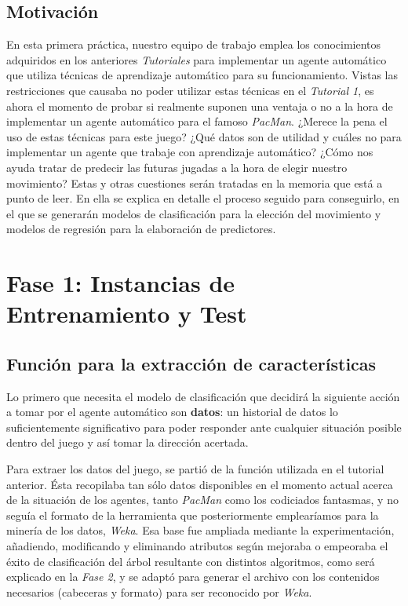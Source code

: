 \documentclass[12pt]{article}
\begin{document}
\newpage
\thispagestyle{empty}
\clearpage
\vspace*{\fill}
\begin{center}
    \begin{minipage}{\textwidth}
        \begin{center}
            \section*{Motivación}
            En esta primera práctica, nuestro equipo de trabajo emplea los conocimientos adquiridos en los anteriores \emph{Tutoriales} para implementar un agente automático que utiliza técnicas de aprendizaje automático para su funcionamiento. Vistas las restricciones que causaba no poder utilizar estas técnicas en el \emph{Tutorial 1}, es ahora el momento de probar si realmente suponen una ventaja o no a la hora de implementar un agente automático para el famoso \emph{PacMan}. ¿Merece la pena el uso de estas técnicas para este juego? ¿Qué datos son de utilidad y cuáles no para implementar un agente que trabaje con aprendizaje automático? ¿Cómo nos ayuda tratar de predecir las futuras jugadas a la hora de elegir nuestro movimiento? Estas y otras cuestiones serán tratadas en la memoria que está a punto de leer. En ella se explica en detalle el proceso seguido para conseguirlo, en el que se generarán modelos de clasificación para la elección del movimiento y modelos de regresión para la elaboración de predictores.
        \end{center}
    \end{minipage}
\end{center}
\vfill

\newpage
\section{Fase 1: Instancias de Entrenamiento y Test}

\subsection{Función para la extracción de características}

Lo primero que necesita el modelo de clasificación que decidirá la siguiente acción a tomar por el agente automático son \textbf{datos}: un historial de datos lo suficientemente significativo para poder responder ante cualquier situación posible dentro del juego y así tomar la dirección acertada.

Para extraer los datos del juego, se partió de la función utilizada en el tutorial anterior. Ésta recopilaba tan sólo datos disponibles en el momento actual acerca de la situación de los agentes, tanto \emph{PacMan} como los codiciados fantasmas, y no seguía el formato de la herramienta que posteriormente emplearíamos para la minería de los datos, \emph{Weka}. Esa base fue ampliada mediante la experimentación, añadiendo, modificando y eliminando atributos según mejoraba o empeoraba el éxito de clasificación del árbol resultante con distintos algoritmos, como será explicado en la \emph{Fase 2}, y se adaptó para generar el archivo con los contenidos necesarios (cabeceras y formato) para ser reconocido por \emph{Weka}.
\end{document}
